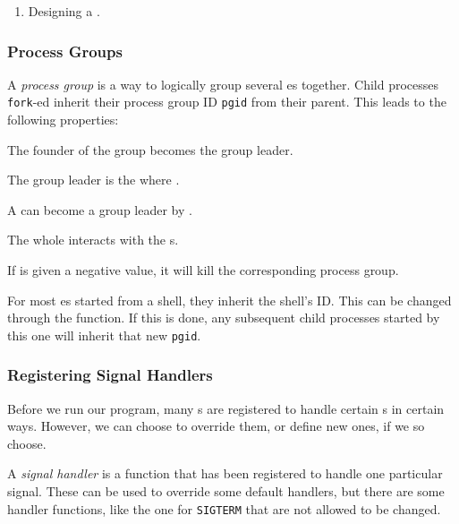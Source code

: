 \begin{enumerate}[noitemsep]
\item Designing a .
\end{enumerate}

\subsubsection{Process Groups}\label{subsubsec:Process_Groups}
\begin{definition}\label{def:Process_Group}
  A \emph{process group} is a way to logically group several es together.
  Child processes \texttt{fork}-ed inherit their process group ID \texttt{pgid} from their parent.
  This leads to the following properties:
  \begin{propertylist}
  \item The founder of the group becomes the group leader.
  \item The group leader is the  where .
  \item A  can become a group leader by .
  \item The whole  interacts with the s.
  \item If  is given a negative value, it will kill the corresponding process group.
  \end{propertylist}
\end{definition}

\begin{remark*}
  For most es started from a shell, they inherit the shell's  ID.\@
  This can be changed through the  function.
  If this is done, any subsequent child processes started by this one will inherit that new \texttt{pgid}.
\end{remark*}

\subsubsection{Registering Signal Handlers}\label{subsubsec:Register_Signal_Handlers}
Before we run our program, many s are registered to handle certain s in certain ways.
However, we can choose to override them, or define new ones, if we so choose.

\begin{definition}\label{def:Signal_Handler}
  A \emph{signal handler} is a function that has been registered to handle one particular signal.
  These can be used to override some default handlers, but there are some handler functions, like the one for \texttt{SIGTERM} that are not allowed to be changed.
\end{definition}

